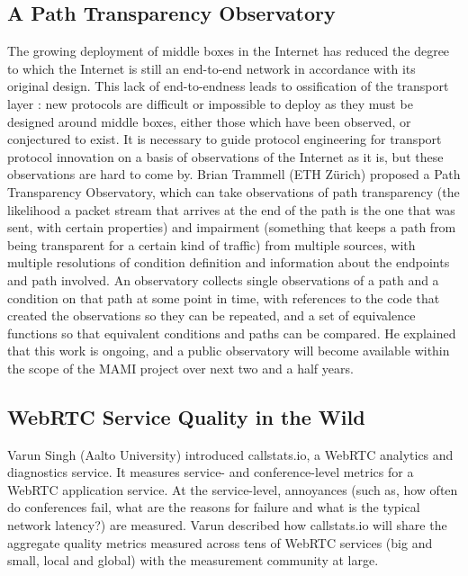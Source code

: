 \subsection{A Path Transparency Observatory}

The growing deployment of middle boxes in the Internet has reduced the degree
to which the Internet is still an end-to-end network in accordance with its
original design. This lack of end-to-endness leads to ossification of the
transport layer \cite{mhonda:imc:2011}: new protocols are difficult or
impossible to deploy as they must be designed around middle boxes, either
those which have been observed, or conjectured to exist. It is necessary to
guide protocol engineering for transport protocol innovation on a basis of
observations of the Internet as it is, but these observations are hard to come
by. Brian Trammell (ETH Z\"urich) proposed a Path Transparency Observatory,
which can take observations of path transparency (the likelihood a packet
stream that arrives at the end of the path is the one that was sent, with
certain properties) and impairment (something that keeps a path from being
transparent for a certain kind of traffic) from multiple sources, with
multiple resolutions of condition definition and information about the
endpoints and path involved. An observatory collects single observations of a
path and a condition on that path at some point in time, with references to
the code that created the observations so they can be repeated, and a set of
equivalence functions so that equivalent conditions and paths can be compared.
He explained that this work is ongoing, and a public observatory will become
available within the scope of the \ac{MAMI} project \cite{mami} over next two
and a half years.

\subsection{WebRTC Service Quality in the Wild}

Varun Singh (Aalto University) introduced callstats.io, a \ac{WebRTC}
analytics and diagnostics service. It measures service- and conference-level
metrics for a \ac{WebRTC} application service. At the service-level,
annoyances (such as, how often do conferences fail, what are the reasons for
failure and what is the typical network latency?) are measured. Varun
described how callstats.io will share the aggregate quality metrics measured
across tens of \ac{WebRTC} services (big and small, local and global) with the
measurement community at large.

